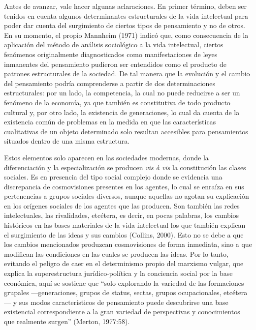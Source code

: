 Antes de avanzar, vale hacer algunas aclaraciones. En primer término, deben ser tenidos en cuenta algunos determinantes estructurales de la vida intelectual para poder dar cuenta del surgimiento de ciertos tipos de pensamiento y no de otros. En su momento, el propio Mannheim (1971) indicó que, como consecuencia de la aplicación del método de análisis sociológico a la vida intelectual, ciertos fenómenos originalmente diagnosticados como manifestaciones de leyes inmanentes del pensamiento pudieron ser entendidos como el producto de patrones estructurales de la sociedad. De tal manera que la evolución y el cambio del pensamiento podría comprenderse a partir de dos determinaciones estructurales: por un lado, la competencia, la cual no puede reducirse a ser un fenómeno de la economía, ya que también es constitutiva de todo producto cultural y, por otro lado, la existencia de generaciones, lo cual da cuenta de la existencia común de problemas en la medida en que las características cualitativas de un objeto determinado solo resultan accesibles para pensamientos situados dentro de una misma estructura.

Estos elementos solo aparecen en las sociedades modernas, donde la diferenciación y la especialización se producen \emph{vis à vis} la constitución las clases sociales. Es en presencia del tipo social complejo donde se evidencia una discrepancia de cosmovisiones presentes en los agentes, lo cual se enraíza en sus pertenencias a grupos sociales diversos, aunque aquellas no agotan su explicación en los orígenes sociales de los agentes que las producen. Son también las redes intelectuales, las rivalidades, etcétera, es decir, en pocas palabras, los cambios históricos en las bases materiales de la vida intelectual los que también explican el surgimiento de las ideas y sus cambios (Collins, 2000). Esto no se debe a que los cambios mencionados produzcan cosmovisiones de forma inmediata, sino a que modifican las condiciones en las cuales se producen las ideas. Por lo tanto, evitando el peligro de caer en el determinismo propio del marxismo vulgar, que explica la superestructura jurídico-política y la conciencia social por la base económica, aquí se sostiene que \enquote{solo explorando la variedad de las formaciones grupales ---generaciones, grupos de status, sectas, grupos ocupacionales, etcétera--- y sus modos característicos de pensamiento puede descubrirse una base existencial correspondiente a la gran variedad de perspectivas y conocimientos que realmente surgen} (Merton, 1977:58).

